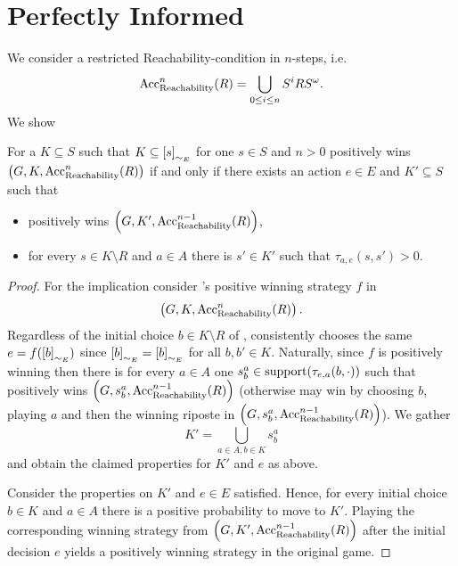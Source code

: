\section{Perfectly Informed \adam{}}
We consider a restricted Reachability-condition in $n$-steps, i.e.
\begin{equation*}
  \operatorname{Acc}_{\operatorname{Reachability}}^{n}(R) = \bigcup_{0\leq i\leq n}S^{i}RS^{\omega}.
\end{equation*}
We show
\begin{proposition}
  For a $K\subseteq S$ such that $K\subseteq\left[s\right]_{\sim_{E}}$ for one 
  $s\in S$ and $n>0$ \eve{} positively wins $\left(G, K, 
  \operatorname{Acc}_{\operatorname{Reachability}}^{n}(R)\right)$ if and only if there exists an action $e\in E$ and 
  $K'\subseteq S$ such that
  \begin{itemize}
    \item \eve{} positively wins $\left(G, K', \operatorname{Acc}_{\operatorname{Reachability}}^{n-1}(R)\right)$,
    \item for every $s\in K\setminus R$ and $a\in A$ there is $s'\in K'$ such 
      that $\tau_{a, e}(s, s') > 0$.
  \end{itemize}
  \label{prop:PerfInfAdamInd}
\end{proposition}
\begin{proof}
  For the implication consider \eve{}'s positive winning strategy $f$ in 
  \begin{equation*}
    \left(G, K, \operatorname{Acc}_{\operatorname{Reachability}}^{n}(R)\right).
  \end{equation*}
  Regardless of the initial choice $b\in K\setminus R$ of \adam{}, \eve{} 
  consistently chooses the same $e = f(\left[b\right]_{\sim_{E}})$ since 
  $\left[b\right]_{\sim_{E}} = \left[b\right]_{\sim_{E}}$ for all $b,b'\in K$. 
  Naturally, since $f$ is positively winning then there is for every $a\in A$ 
  one $s_{b}^{a}\in\operatorname{support}(\tau_{e, a}(b, \cdot))$ such that \eve{} positively 
  wins $\left(G, s_{b}^{a}, \operatorname{Acc}_{\operatorname{Reachability}}^{n-1}(R)\right)$ (otherwise \adam{} may 
  win by choosing $b$, playing $a$ and then the winning riposte in 
  $\left(G, s_{b}^{a}, \operatorname{Acc}_{\operatorname{Reachability}}^{n-1}(R)\right)$). We gather
  \begin{equation*}
    K' = \bigcup_{a\in A, b\in K}s_{b}^{a}
  \end{equation*}
  and obtain the claimed properties for $K'$ and $e$ as above.

  Consider the properties on $K'$ and $e\in E$ satisfied. Hence, for every 
  initial choice $b\in K$ and $a\in A$ there is a positive probability to move
  to $K'$. Playing the corresponding winning strategy from $\left(G, K', 
  \operatorname{Acc}_{\operatorname{Reachability}}^{n-1}(R)\right)$ after the initial decision $e$ yields a positively
  winning strategy in the original game.
\end{proof}
